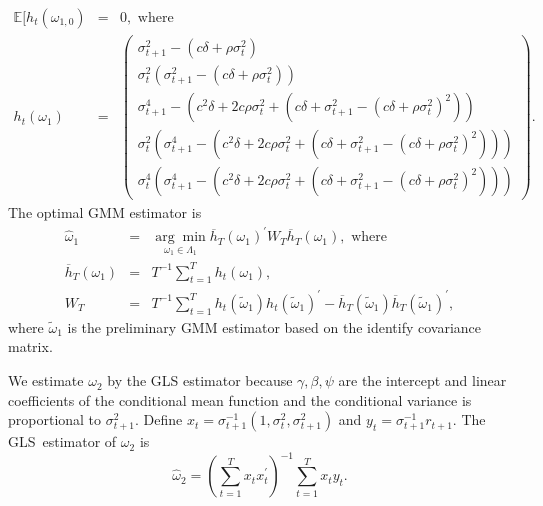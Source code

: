 \documentclass[11pt, letterpaper, twoside, final]{article}
\begin{document}
\begin{eqnarray}
    \mathbb{E}[h_{t}(\omega_{1,0}) & = &0,\text{ where}  \nonumber \\
%
    h_{t}(\omega_{1}) & = &\left(
        \begin{array}{c} 
            \sigma_{t+1}^{2}-\left( c\delta +\rho \sigma_{t}^{2}\right)  \\ 
%
            \sigma_{t}^{2}\left( \sigma_{t+1}^{2}-\left( c\delta +\rho \sigma _{t}^{2}\right) \right)  \\ 
%
            \sigma_{t+1}^{4}-\left( c^{2}\delta +2c\rho \sigma_{t}^{2}+\left( c\delta +\sigma_{t+1}^{2}-\left(
            c\delta +\rho \sigma_{t}^{2}\right) ^{2}\right) \right)  \\ 
%
            \sigma_{t}^{2}\left( \sigma_{t+1}^{4}-\left( c^{2}\delta +2c\rho \sigma _{t}^{2}+\left( c\delta
            +\sigma_{t+1}^{2}-\left( c\delta +\rho \sigma _{t}^{2}\right) ^{2}\right) \right) \right)  \\ 
%
            \sigma_{t}^{4}\left( \sigma_{t+1}^{4}-\left( c^{2}\delta +2c\rho \sigma _{t}^{2}+\left( c\delta
            +\sigma_{t+1}^{2}-\left( c\delta +\rho \sigma _{t}^{2}\right) ^{2}\right) \right) \right) 
        \end{array}\right).
\end{eqnarray}
%
The optimal GMM estimator is
%
\begin{eqnarray}
    \widehat{\omega}_{1} & = & \underset{\omega_{1}\in \Lambda_{1}}{\arg\min} 
%
    \overline{h}_{T}(\omega_{1})^{\prime}W_{T}\overline{h}_{T}(\omega_{1}), \text{ where}  \nonumber \\ 
%
    \overline{h}_{T}(\omega_{1}) & = &T^{-1}\sum_{t = 1}^{T}h_{t}(\omega_{1}), \nonumber \\
%
    W_{T} & = &T^{-1}\sum_{t = 1}^{T}h_{t}(\widetilde{\omega}_{1})h_{t}(\widetilde{\omega}_{1})^{\prime
   }-\overline{h}_{T}(\widetilde{\omega}_{1})\overline{h} _{T}(\widetilde{\omega}_{1})^{\prime},
\end{eqnarray}
%
where $\widetilde{\omega}_{1}$ is the preliminary GMM estimator based on the identify covariance matrix.

We estimate $\omega_{2}$ by the GLS estimator because $\gamma, \beta, \psi$ are the intercept and linear
coefficients of the conditional mean function and the conditional variance is proportional to $\sigma_{t+1}^{2}$. 
Define $x_{t} = \sigma_{t+1}^{-1}(1,\sigma_{t}^{2},\sigma_{t+1}^{2})$ and $y_{t} = \sigma_{t+1}^{-1}r_{t+1}$. 
The GLS\ estimator of $\omega_{2}$ is
%
\begin{equation}
    \widehat{\omega}_{2} = \left( \sum_{t = 1}^{T}x_{t}x_{t}^{\prime}\right) ^{-1}\sum_{t = 1}^{T}x_{t}y_{t}.
\end{equation}
\end{document}
